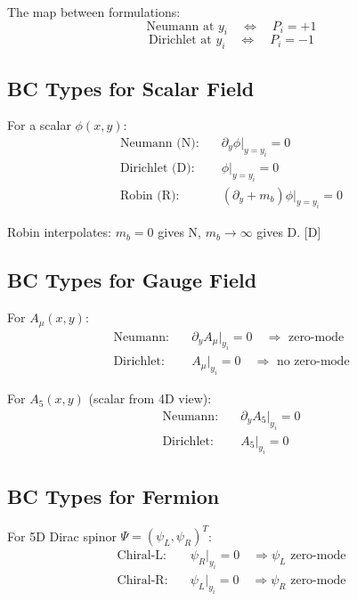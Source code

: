\documentclass[11pt,a4paper]{article}
\newcommand{\tagD}{\textcolor{blue!70!black}{[D]}}
\begin{document}
The map between formulations:
\begin{equation}
\label{eq:interval-orbifold}
\text{Neumann at } y_i \quad \Leftrightarrow \quad P_i = +1
\end{equation}
\begin{equation}
\label{eq:interval-orbifold-D}
\text{Dirichlet at } y_i \quad \Leftrightarrow \quad P_i = -1
\end{equation}

\subsection{BC Types for Scalar Field}

For a scalar $\phi(x, y)$:
\begin{align}
\label{eq:bc-N}
\text{Neumann (N):} \quad & \partial_y \phi \big|_{y=y_i} = 0 \\
\label{eq:bc-D}
\text{Dirichlet (D):} \quad & \phi \big|_{y=y_i} = 0 \\
\label{eq:bc-R}
\text{Robin (R):} \quad & (\partial_y + m_b) \phi \big|_{y=y_i} = 0
\end{align}

Robin interpolates: $m_b = 0$ gives N, $m_b \to \infty$ gives D. \tagD

\subsection{BC Types for Gauge Field}

For $A_\mu(x, y)$:
\begin{align}
\label{eq:bc-gauge-N}
\text{Neumann:} \quad & \partial_y A_\mu \big|_{y_i} = 0 \quad \Rightarrow \text{ zero-mode} \\
\label{eq:bc-gauge-D}
\text{Dirichlet:} \quad & A_\mu \big|_{y_i} = 0 \quad \Rightarrow \text{ no zero-mode}
\end{align}

For $A_5(x, y)$ (scalar from 4D view):
\begin{align}
\label{eq:bc-A5-N}
\text{Neumann:} \quad & \partial_y A_5 \big|_{y_i} = 0 \\
\label{eq:bc-A5-D}
\text{Dirichlet:} \quad & A_5 \big|_{y_i} = 0
\end{align}

\subsection{BC Types for Fermion}

For 5D Dirac spinor $\Psi = (\psi_L, \psi_R)^T$:
\begin{align}
\label{eq:bc-ferm-L}
\text{Chiral-L:} \quad & \psi_R \big|_{y_i} = 0 \quad \Rightarrow \psi_L \text{ zero-mode} \\
\label{eq:bc-ferm-R}
\text{Chiral-R:} \quad & \psi_L \big|_{y_i} = 0 \quad \Rightarrow \psi_R \text{ zero-mode}
\end{align}
\end{document}
